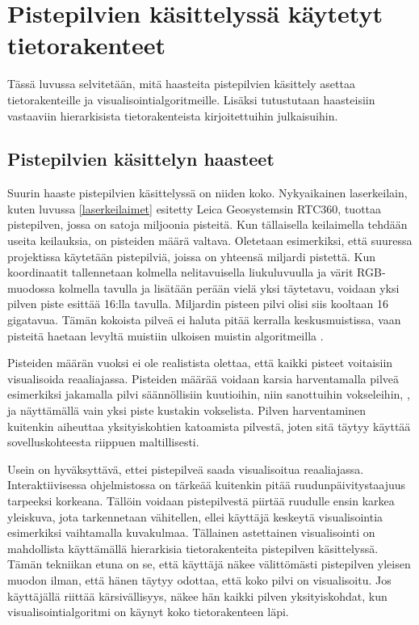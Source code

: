 \section{Pistepilvien käsittelyssä käytetyt tietorakenteet}\label{kirjallisuus}

Tässä luvussa selvitetään, mitä haasteita pistepilvien käsittely asettaa tietorakenteille ja visualisointialgoritmeille. Lisäksi tutustutaan haasteisiin vastaaviin hierarkisista tietorakenteista kirjoitettuihin julkaisuihin.

\subsection{Pistepilvien käsittelyn haasteet}

Suurin haaste pistepilvien käsittelyssä on niiden koko. Nykyaikainen laserkeilain, kuten luvussa \ref{laserkeilaimet} esitetty Leica Geosystemsin RTC360, tuottaa pistepilven, jossa on satoja miljoonia pisteitä. Kun tällaisella keilaimella tehdään useita keilauksia, on pisteiden määrä valtava. Oletetaan esimerkiksi, että suuressa projektissa käytetään pistepilviä, joissa on yhteensä miljardi pistettä. Kun koordinaatit tallennetaan kolmella nelitavuisella liukuluvuulla ja värit RGB-muodossa kolmella tavulla ja lisätään perään vielä yksi täytetavu, voidaan yksi pilven piste esittää 16:lla tavulla. Miljardin pisteen pilvi olisi siis kooltaan 16 gigatavua. Tämän kokoista pilveä ei haluta pitää kerralla keskusmuistissa, vaan pisteitä haetaan levyltä muistiin ulkoisen muistin algoritmeilla .

Pisteiden määrän vuoksi ei ole realistista olettaa, että kaikki pisteet voitaisiin visualisoida reaaliajassa. Pisteiden määrää voidaan karsia harventamalla pilveä esimerkiksi jakamalla pilvi säännöllisiin kuutioihin, niin sanottuihin vokseleihin, , ja näyttämällä vain yksi piste kustakin vokselista. %
Pilven harventaminen kuitenkin aiheuttaa yksityiskohtien katoamista pilvestä, joten sitä täytyy käyttää sovelluskohteesta riippuen maltillisesti. 

Usein on hyväksyttävä, ettei pistepilveä saada visualisoitua reaaliajassa. Interaktiivisessa ohjelmistossa on tärkeää kuitenkin pitää ruudunpäivitystaajuus tarpeeksi korkeana. Tällöin voidaan pistepilvestä piirtää ruudulle ensin karkea yleiskuva, jota tarkennetaan vähitellen, ellei käyttäjä keskeytä visualisointia esimerkiksi vaihtamalla kuvakulmaa. Tällainen astettainen visualisointi on mahdollista käyttämällä hierarkisia tietorakenteita pistepilven käsittelyssä. Tämän tekniikan etuna on se, että käyttäjä näkee välittömästi pistepilven yleisen muodon ilman, että hänen täytyy odottaa, että koko pilvi on visualisoitu. Jos käyttäjällä riittää kärsivällisyys, näkee hän kaikki pilven yksityiskohdat, kun visualisointialgoritmi on käynyt koko tietorakenteen läpi. 


